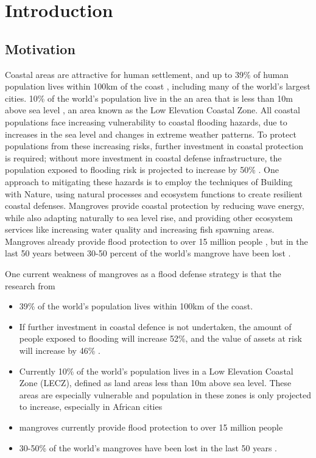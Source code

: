 \chapter{Introduction}

\section{Motivation}

Coastal areas are attractive for human settlement, and up to 39\% of human population lives within 100km of the coast \parencite{Magdalena2021}, including many of the world's largest cities. 10\% of the world's population live in the an area that is less than 10m above sea level \parencite{Neumann2015,Lichter2011}, an area known as the Low Elevation Coastal Zone. All coastal populations face increasing vulnerability to coastal flooding hazards, due to increases in the sea level and changes in extreme weather patterns. To protect populations from these increasing risks, further investment in coastal protection is required; without more investment in coastal defense infrastructure, the population exposed to flooding risk is projected to increase by 50\% \Parencite{Kirezci2020}. One approach to mitigating these hazards is to employ the techniques of Building with Nature, using natural processes and ecosystem functions to create resilient coastal defenses.  Mangroves provide coastal protection by reducing wave energy, while also adapting naturally to sea level rise, and providing other ecosystem services like increasing water quality and increasing fish spawning areas. Mangroves already provide flood protection to over 15 million people \parencite{Menendez2020}, but in the last 50 years between 30-50 percent of the world's mangrove have been lost \parencite{add}.

One current weakness of mangroves as a flood defense strategy is that the research from 

\begin{itemize}
      \item 39\% of the world's population lives within 100km of the coast.\parencite{Magdalena2021}
      \item If further investment in coastal defence is not undertaken, the amount of people exposed to flooding will increase 52\%, and the value of assets at risk will increase by 46\% \parencite{Kirezci2020}.
      \item Currently 10\% of the world's population lives in a Low Elevation Coastal Zone (LECZ), defined as land areas less than 10m above sea level. These areas are especially vulnerable and population in these zones is only projected to increase, especially in African cities \parencite{Neumann2015,Lichter2011}
      \item mangroves currently provide flood protection to over 15 million people \parencite{Menendez2020}
      \item 30-50\% of the world's mangroves have been lost in the last 50 years \parencite{}. 
\end{itemize}

